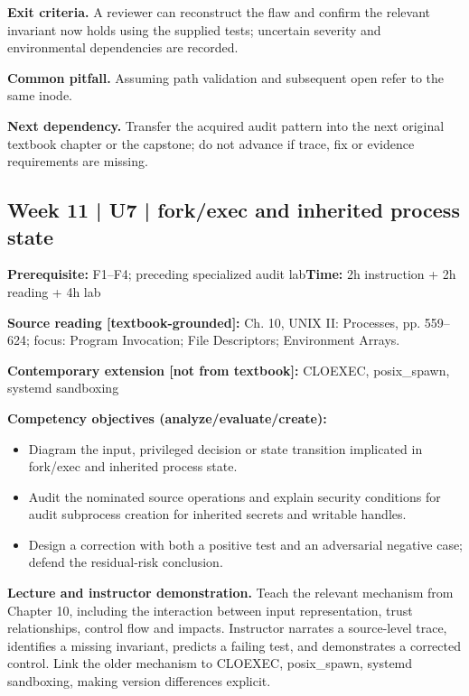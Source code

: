 \documentclass[10pt,letterpaper]{article}
\begin{document}
\textbf{Exit criteria.} A reviewer can reconstruct the flaw and confirm the relevant invariant now holds using the supplied tests; uncertain severity and environmental dependencies are recorded.

\textbf{Common pitfall.} Assuming path validation and subsequent open refer to the same inode.

\textbf{Next dependency.} Transfer the acquired audit pattern into the next original textbook chapter or the capstone; do not advance if trace, fix or evidence requirements are missing.

\subsection{Week 11 | U7 | fork/exec and inherited process state}
\textbf{Prerequisite:} F1--F4; preceding specialized audit lab\hfill\textbf{Time:} 2h instruction + 2h reading + 4h lab

\textbf{Source reading [textbook-grounded]:} Ch. 10, UNIX II: Processes, pp. 559--624; focus: Program Invocation; File Descriptors; Environment Arrays.

\textbf{Contemporary extension [not from textbook]:} CLOEXEC, posix\_spawn, systemd sandboxing

\textbf{Competency objectives (analyze/evaluate/create):}
\begin{itemize}[leftmargin=*,itemsep=2pt]
\item Diagram the input, privileged decision or state transition implicated in fork/exec and inherited process state.
\item Audit the nominated source operations and explain security conditions for audit subprocess creation for inherited secrets and writable handles.
\item Design a correction with both a positive test and an adversarial negative case; defend the residual-risk conclusion.
\end{itemize}
\textbf{Lecture and instructor demonstration.} Teach the relevant mechanism from Chapter 10, including the interaction between input representation, trust relationships, control flow and impacts. Instructor narrates a source-level trace, identifies a missing invariant, predicts a failing test, and demonstrates a corrected control. Link the older mechanism to CLOEXEC, posix\_spawn, systemd sandboxing, making version differences explicit.
\end{document}
